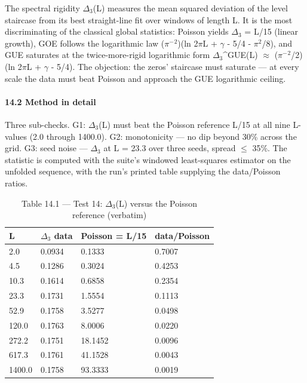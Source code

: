\documentclass[10pt]{article}
\begin{document}
The spectral rigidity $\Delta$$_3$(L) measures the mean squared deviation of the level staircase from its best straight-line fit over windows of length L. It is the most discriminating of the classical global statistics: Poisson yields $\Delta$$_3$ = L/15 (linear growth), GOE follows the logarithmic law ($\pi$$^-$$^2$)(ln 2$\pi$L + $\gamma$ - 5/4 - $\pi$$^2$/8), and GUE saturates at the twice-more-rigid logarithmic form $\Delta$$_3$\textasciicircum{}GUE(L) $\approx$ ($\pi$$^-$$^2$/2)(ln 2$\pi$L + $\gamma$ - 5/4). The objection: the zeros' staircase must saturate --- at every scale the data must beat Poisson and approach the GUE logarithmic ceiling.

\paragraph{14.2 Method in detail}

Three sub-checks. G1: $\Delta$$_3$(L) must beat the Poisson reference L/15 at all nine L-values (2.0 through 1400.0). G2: monotonicity --- no dip beyond 30\% across the grid. G3: seed noise --- $\Delta$$_3$ at L = 23.3 over three seeds, spread $\le$ 35\%. The statistic is computed with the suite's windowed least-squares estimator on the unfolded sequence, with the run's printed table supplying the data/Poisson ratios.

\begin{table}[htbp]
\centering
\small
\caption{Table 14.1 --- Test 14: $\Delta$$_3$(L) versus the Poisson reference (verbatim)}
\begin{tabular}{llll}
\toprule
\textbf{L} & \textbf{$\Delta$$_3$ data} & \textbf{Poisson = L/15} & \textbf{data/Poisson} \\
\midrule
2.0 & 0.0934 & 0.1333 & 0.7007 \\
4.5 & 0.1286 & 0.3024 & 0.4253 \\
10.3 & 0.1614 & 0.6858 & 0.2354 \\
23.3 & 0.1731 & 1.5554 & 0.1113 \\
52.9 & 0.1758 & 3.5277 & 0.0498 \\
120.0 & 0.1763 & 8.0006 & 0.0220 \\
272.2 & 0.1751 & 18.1452 & 0.0096 \\
617.3 & 0.1761 & 41.1528 & 0.0043 \\
1400.0 & 0.1758 & 93.3333 & 0.0019 \\
\bottomrule
\end{tabular}
\end{table}
\end{document}
